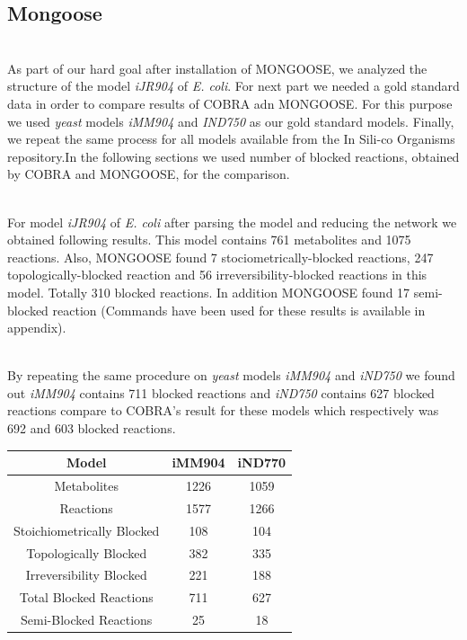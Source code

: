 \documentclass[11pt, a4paper]{article}
\begin{document}
	\subsection{Mongoose}
	~\\ As part of our hard goal after installation of MONGOOSE, we analyzed the structure of the model \textit{iJR904} of \textit{E. coli}. For next part we needed a gold standard data in order to compare results of COBRA adn MONGOOSE. For this purpose we used \textit{yeast} models \textit{iMM904} and \textit{IND750} as our gold standard models. Finally, we repeat the same process for all  models available from the In Sili-co Organisms repository.In the following sections we used number of blocked reactions, obtained by COBRA and MONGOOSE, for the  comparison.

	~\\For model \textit{iJR904} of \textit{E. coli} after parsing the model and reducing the network we obtained following results. This model contains 761 metabolites and 1075 reactions. Also, MONGOOSE found 7 stociometrically-blocked reactions, 247 topologically-blocked reaction and 56 irreversibility-blocked reactions in this model. Totally 310 blocked reactions. In addition MONGOOSE found 17 semi-blocked reaction (Commands have been used for these results is available in appendix).

	~\\By repeating the same procedure on \textit{yeast} models \textit{iMM904} and \textit{iND750} we found out \textit{iMM904} contains 711 blocked reactions and \textit{ iND750} contains 627 blocked reactions compare to COBRA's result for these models which respectively was 692 and 603 blocked reactions. 
	\begin{center}

	\label{yestResults}
	    \begin{tabular}{|c|c|c|}
	        \hline
	        Model                         & iMM904 & iND770 \\ \hline
	        Metabolites                & 1226  & 1059   \\ 
	        Reactions                  & 1577   & 1266   \\ 
	        Stoichiometrically Blocked & 108    & 104    \\ 
	        Topologically Blocked      & 382    & 335    \\ 
	        Irreversibility Blocked    & 221    & 188    \\ 
	        Total Blocked Reactions    & 711    & 627    \\ 
	        Semi-Blocked Reactions     & 25     & 18     \\
	        \hline
	    \end{tabular}
	\end{center}
\end{document}
